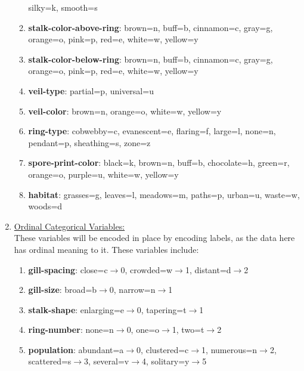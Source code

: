 \documentclass[10pt,letterpaper]{article}
\begin{document}
\begin{enumerate}
\begin{enumerate}[label=\roman*.]
            silky=k,
            smooth=s
        \item \textbf{stalk-color-above-ring}:
            brown=n,
            buff=b,
            cinnamon=c,
            gray=g,
            orange=o,
            pink=p,
            red=e,
            white=w,
            yellow=y
        \item \textbf{stalk-color-below-ring}:
            brown=n,
            buff=b,
            cinnamon=c,
            gray=g,
            orange=o,
            pink=p,
            red=e,
            white=w,
            yellow=y
        \item \textbf{veil-type}:
            partial=p,
            universal=u
        \item \textbf{veil-color}:
            brown=n,
            orange=o,
            white=w,
            yellow=y
        \item \textbf{ring-type}:
            cobwebby=c,
            evanescent=e,
            flaring=f,
            large=l,
            none=n,
            pendant=p,
            sheathing=s,
            zone=z
        \item \textbf{spore-print-color}:
            black=k,
            brown=n,
            buff=b,
            chocolate=h,
            green=r,
            orange=o,
            purple=u,
            white=w,
            yellow=y
        \item \textbf{habitat}:
            grasses=g,
            leaves=l,
            meadows=m,
            paths=p,
            urban=u,
            waste=w,
            woods=d
    \end{enumerate}
    \item \underline{Ordinal Categorical Variables:}\\
    These variables will be encoded in place by encoding labels, as the data here has
    ordinal meaning to it. These variables include:
    \begin{enumerate}[label=\roman*.]
        \item \textbf{gill-spacing}:
            close=c$\to$0,
            crowded=w$\to$1,
            distant=d$\to$2
        \item \textbf{gill-size}:
            broad=b$\to$0,
            narrow=n$\to$1
        \item \textbf{stalk-shape}:
            enlarging=e$\to$0,
            tapering=t$\to$1
        \item \textbf{ring-number}:
            none=n$\to$0,
            one=o$\to$1,
            two=t$\to$2
        \item \textbf{population}:
            abundant=a$\to$0,
            clustered=c$\to$1,
            numerous=n$\to$2,
            scattered=s$\to$3,
            several=v$\to$4,
            solitary=y$\to$5
    \end{enumerate}
\end{enumerate}
\end{document}
